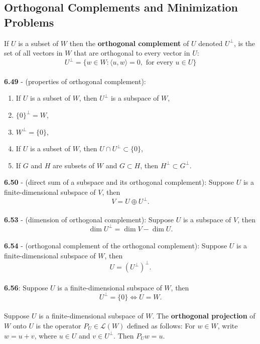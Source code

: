 \documentclass{article}
\DeclareMathOperator{\Dim}{dim}
\theoremstyle{definition}
\begin{document}
\subsection*{Orthogonal Complements and Minimization Problems}
If $U$ is a subset of $W$ then the \textbf{orthogonal complement} of $U$ denoted $U^{\perp}$, is the set of all vectors in $W$ that are orthogonal to every vector in $U$: $$U^{\perp} = \{w \in W: \langle u, w \rangle = 0, \text{ for every } u \in U\}$$ \\
\textbf{6.49} - (properties of orthogonal complement): \begin{enumerate}
    \item If $U$ is a subset of $W$, then $U^{\perp}$ is a subspace of $W$,
    \item $\{0\}^{\perp} = W$,
    \item $W^{\perp} = \{0\}$,
    \item If $U$ is a subset of $W$, then $U \cap U^{\perp} \subset \{0\}$,
    \item If $G$ and $H$ are subsets of $W$ and $G \subset H$, then $H^{\perp} \subset G^{\perp}$.
\end{enumerate} $ $ \\
\textbf{6.50} - (direct sum of a subspace and its orthogonal complement): Suppose $U$ is a finite-dimensional subspace of $V$, then $$V = U \oplus U^{\perp}.$$ \\
\textbf{6.53} - (dimension of orthogonal complement): Suppose $U$ is a subspace of $V$, then $$\Dim{U^{\perp}} = \Dim{V} - \Dim{U}.$$ \\
\textbf{6.54} - (orthogonal complement of the orthogonal complement): Suppose $U$ is a finite-dimensional subspace of $W$, then $$U = (U^{\perp})^{\perp}.$$ \\
\textbf{6.56}: Suppose $U$ is a finite-dimensional subspace of $W$, then $$U^{\perp} = \{0\} \iff U = W.$$ \\
Suppose $U$ is a finite-dimensional subspace of $W.$ The \textbf{orthogonal projection}
of $W$ onto $U$ is the operator $P_U \in \mathcal{L}(W)$ defined as follows: For $w \in W$, write $w = u + v$, where $u \in U$ and $v \in U^{\perp}$. Then $P_U w = u$. \\ \\
\end{document}
